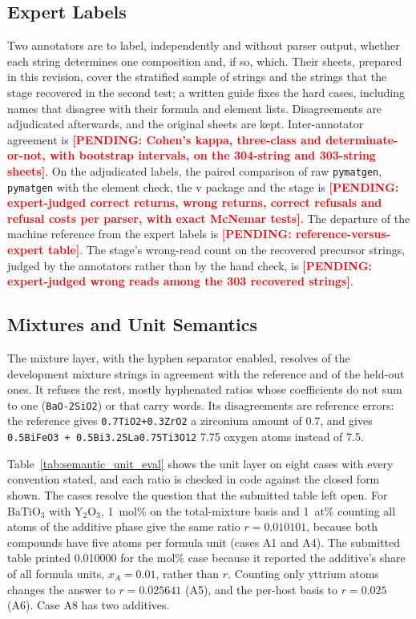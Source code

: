 \documentclass[10pt,journal]{IEEEtran}
\newcommand{\PENDING}[1]{\textcolor{red}{\textbf{[PENDING: #1]}}}
\newcommand{\pmg}{\texttt{pymatgen}\xspace}
\begin{document}
\subsection{Expert Labels}
\label{sec:expert}
Two annotators are to label, independently and without parser output, whether each string determines one composition and, if so, which. Their sheets, prepared in this revision, cover the stratified sample of \NAnnotation{} strings and the \StTwoRescued{} strings that the stage recovered in the second test; a written guide fixes the hard cases, including names that disagree with their formula and element lists. Disagreements are adjudicated afterwards, and the original sheets are kept. Inter-annotator agreement is \PENDING{Cohen's kappa, three-class and determinate-or-not, with bootstrap intervals, on the 304-string and 303-string sheets}. On the adjudicated labels, the paired comparison of raw \pmg, \pmg with the element check, the v\ParserVersion{} package and the stage is \PENDING{expert-judged correct returns, wrong returns, correct refusals and refusal costs per parser, with exact McNemar tests}. The departure of the machine reference from the expert labels is \PENDING{reference-versus-expert table}. The stage's wrong-read count on the recovered precursor strings, judged by the annotators rather than by the hand check, is \PENDING{expert-judged wrong reads among the 303 recovered strings}.

\subsection{Mixtures and Unit Semantics}
\label{sec:units_results}
The mixture layer, with the hyphen separator enabled, resolves \DevMixAgree{} of the \NDevMix{} development mixture strings in agreement with the reference and \HoMixAgree{} of the \NHoMix{} held-out ones. It refuses the rest, mostly hyphenated ratios whose coefficients do not sum to one (\texttt{BaO-2SiO2}) or that carry words. Its \DevMixDisagree{} disagreements are reference errors: the reference gives \texttt{0.7TiO2+0.3ZrO2} a zirconium amount of 0.7, and gives \texttt{0.5BiFeO3 + 0.5Bi3.25La0.75Ti3O12} 7.75 oxygen atoms instead of 7.5.

Table~\ref{tab:semantic_unit_eval} shows the unit layer on eight cases with every convention stated, and each ratio is checked in code against the closed form shown. The cases resolve the question that the submitted table left open. For BaTiO$_3$ with Y$_2$O$_3$, 1~mol\% on the total-mixture basis and 1~at\% counting all atoms of the additive phase give the same ratio $r=0.010101$, because both compounds have five atoms per formula unit (cases A1 and A4). The submitted table printed 0.010000 for the mol\% case because it reported the additive's share of all formula units, $x_A=0.01$, rather than $r$. Counting only yttrium atoms changes the answer to $r=0.025641$ (A5), and the per-host basis to $r=0.025$ (A6). Case A8 has two additives.
\end{document}
